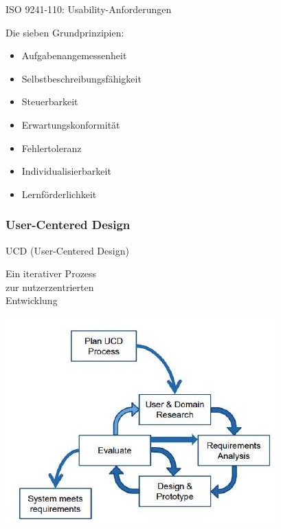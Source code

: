 \begin{theorem}{ISO 9241-110: Usability-Anforderungen}

    \begin{minipage}{0.45\linewidth}
        Die sieben Grundprinzipien:
        \begin{itemize}
            \item Aufgabenangemessenheit
            \item Selbstbeschreibungsfähigkeit
            \item Steuerbarkeit
        \end{itemize}
    \end{minipage}
    \begin{minipage}{0.45\linewidth}
        \begin{itemize}
            \item Erwartungskonformität
            \item Fehlertoleranz
            \item Individualisierbarkeit
            \item Lernförderlichkeit
        \end{itemize}
    \end{minipage}
\end{theorem}

\subsubsection{User-Centered Design}

\begin{concept}{UCD (User-Centered Design)}

\begin{minipage}{0.3\linewidth}
Ein iterativer Prozess \\ zur nutzerzentrierten \\ Entwicklung
\end{minipage}
\begin{minipage}{0.65\linewidth}
    \includegraphics[width=\linewidth]{images/2024_12_29_0d1d7b5551ea1b4b41bdg-03}
    \end{minipage}
\end{concept}

